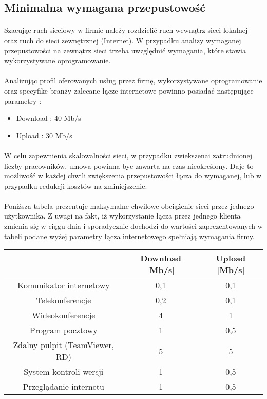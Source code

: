 \subsection{Minimalna wymagana przepustowość}
\paragraph{}
Szacując ruch sieciowy w firmie należy rozdzielić ruch wewnątrz sieci lokalnej oraz ruch do sieci zewnętrznej (Internet). W przypadku analizy wymaganej przepustowości na zewnątrz sieci trzeba uwzględnić wymagania, które stawia wykorzystywane oprogramowanie.
\paragraph{}
Analizując profil oferowanych usług przez firmę, wykorzystywane oprogramowanie oraz specyfike branży zalecane łącze internetowe powinno posiadać następujące parametry :
\begin{itemize}
	\item Download : 40 Mb/s
	\item Upload : 30 Mb/s
\end{itemize}
\paragraph{}
W celu zapewnienia skalowalności sieci, w przypadku zwiekszenai zatrudnionej liczby pracowników, umowa powinna byc zawarta na czas nieokreślony. Daje to możliwość w każdej chwili zwiększenia przepustowości łącza do wymaganej, lub w przypadku redukcji kosztów na zminiejszenie.

\paragraph{}
Poniższa tabela prezentuje maksymalne chwilowe obciążenie sieci przez jednego użytkownika. Z uwagi na fakt, iż wykorzystanie łącza przez jednego klienta zmienia się w ciągu dnia i sporadycznie dochodzi do wartości zaprezentowanych w tabeli podane wyżej parametry łącza internetowego spełniają wymagania firmy.

\begin{center}
    \begin{tabular}{|c|c|c|}
    \hline
       & Download [Mb/s]                & Upload [Mb/s] \\ \hline
       Komunikator internetowy          & 0,1   & 0,1   \\ \hline
       Telekonferencje                  & 0,2   & 0,1   \\ \hline
       Wideokonferencje                 & 4     & 1   \\ \hline
       Program pocztowy                 & 1     & 0,5   \\ \hline
       Zdalny pulpit (TeamViewer, RD)   & 5     & 5     \\ \hline
       System kontroli wersji           & 1     & 0,5   \\ \hline
       Przeglądanie internetu           & 1     & 0,5   \\ \hline
   \end{tabular}
\end{center}

